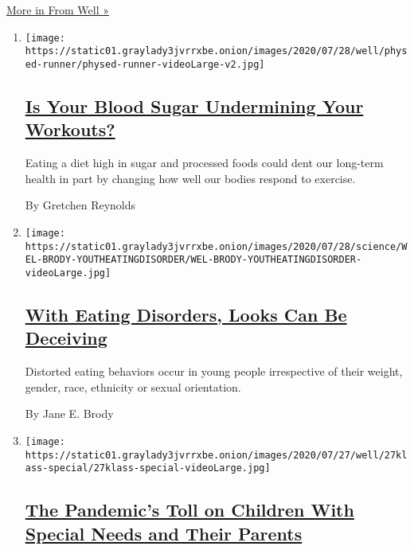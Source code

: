\href{/section/well}{More in From Well »}

\begin{enumerate}
\def\labelenumi{\arabic{enumi}.}
\item
  \texttt{[image: https://static01.graylady3jvrrxbe.onion/images/2020/07/28/well/physed-runner/physed-runner-videoLarge-v2.jpg]}

  \hypertarget{is-your-blood-sugar-undermining-your-workouts}{%
  \subsection{\texorpdfstring{\href{/2020/07/29/well/move/blood-sugar-diet-foods-workouts-exercise-muscles.html}{Is
  Your Blood Sugar Undermining Your
  Workouts?}}{Is Your Blood Sugar Undermining Your Workouts?}}\label{is-your-blood-sugar-undermining-your-workouts}}

  Eating a diet high in sugar and processed foods could dent our
  long-term health in part by changing how well our bodies respond to
  exercise.

  By Gretchen Reynolds
\item
  \texttt{[image: https://static01.graylady3jvrrxbe.onion/images/2020/07/28/science/WEL-BRODY-YOUTHEATINGDISORDER/WEL-BRODY-YOUTHEATINGDISORDER-videoLarge.jpg]}

  \hypertarget{with-eating-disorders-looks-can-be-deceiving}{%
  \subsection{\texorpdfstring{\href{/2020/07/27/well/eat/eating-disorders.html}{With
  Eating Disorders, Looks Can Be
  Deceiving}}{With Eating Disorders, Looks Can Be Deceiving}}\label{with-eating-disorders-looks-can-be-deceiving}}

  Distorted eating behaviors occur in young people irrespective of their
  weight, gender, race, ethnicity or sexual orientation.

  By Jane E. Brody
\item
  \texttt{[image: https://static01.graylady3jvrrxbe.onion/images/2020/07/27/well/27klass-special/27klass-special-videoLarge.jpg]}

  \hypertarget{the-pandemics-toll-on-children-with-special-needs-and-their-parents}{%
  \subsection{\texorpdfstring{\href{/2020/07/27/well/family/children-special-needs-pandemic.html}{The
  Pandemic's Toll on Children With Special Needs and Their
  Parents}}{The Pandemic's Toll on Children With Special Needs and Their Parents}}\label{the-pandemics-toll-on-children-with-special-needs-and-their-parents}}


\end{enumerate}
